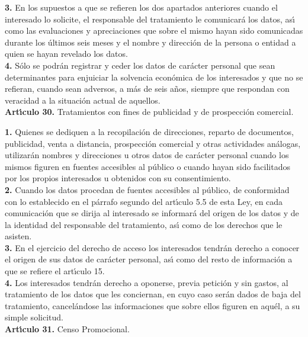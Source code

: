 {\bf 3.} En los supuestos a que se refieren los dos apartados anteriores cuando 
el interesado lo solicite, el responsable del tratamiento le comunicar\'a los 
datos, as\'{\i} como las evaluaciones y apreciaciones que sobre el mismo hayan 
sido comunicadas durante los \'ultimos seis meses y el nombre y direcci\'on de 
la persona o entidad a quien se hayan revelado los datos.\\

{\bf 4.} S\'olo se podr\'an registrar y ceder los datos de car\'acter personal 
que sean determinantes para enjuiciar la solvencia econ\'omica de los 
interesados y que no se refieran, cuando sean adversos, a m\'as de seis a\~nos,
siempre que respondan con veracidad a la situaci\'on actual de aquellos.
\vspace{0.3cm}\\
{\large {\bf Art\'{\i}culo 30.} Tratamientos con fines de publicidad y de 
prospecci\'on comercial.}

{\bf 1.} Quienes se dediquen a la recopilaci\'on de direcciones, reparto de 
documentos, publicidad, venta a distancia, prospecci\'on comercial y otras 
actividades an\'alogas, utilizar\'an nombres y direcciones u otros datos de 
car\'acter personal cuando los mismos figuren en fuentes accesibles al 
p\'ublico o cuando hayan sido facilitados por los propios interesados u 
obtenidos con su consentimiento.\\

{\bf 2.} Cuando los datos procedan de fuentes accesibles al p\'ublico, de 
conformidad con lo establecido en el p\'arrafo segundo del art\'{\i}culo 5.5 de 
esta Ley, en cada comunicaci\'on que se dirija al interesado se informar\'a del 
origen de los datos y de la identidad del responsable del tratamiento, as\'{\i} 
como de los derechos que le asisten.\\

{\bf 3.} En el ejercicio del derecho de acceso los interesados tendr\'an 
derecho a conocer el origen de sus datos de car\'acter personal, as\'{\i} como 
del resto de informaci\'on a que se refiere el art\'{\i}culo 15.\\

{\bf 4.} Los interesados tendr\'an derecho a oponerse, previa petici\'on y sin 
gastos, al tratamiento de los datos que les conciernan, en cuyo caso ser\'an 
dados de baja del tratamiento, cancel\'andose las informaciones que sobre ellos 
figuren en aqu\'el, a su simple solicitud.
\vspace{0.3cm}\\
{\large {\bf Art\'{\i}culo 31.} Censo Promocional.}

